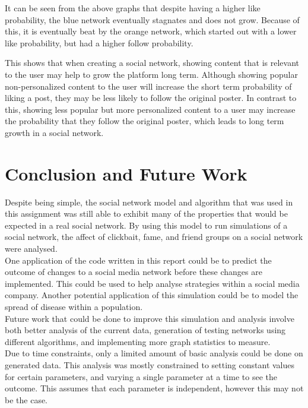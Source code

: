 \documentclass{article}
\begin{document}
It can be seen from the above graphs that despite having a higher like probability,
the blue network eventually stagnates and does not grow. Because of this,
it is eventually beat by the orange network, which started out with a lower like probability,
but had a higher follow probability.

This shows that when creating a social network, showing content that is relevant
to the user may help to grow the platform long term. Although showing 
popular non-personalized content to the user will increase the short term probability of liking a post,
they may be less likely to follow the original poster.
In contrast to this, showing less popular but more personalized content to a user
may increase the probability that they follow the original poster, which leads
to long term growth in a social network.

\section{Conclusion and Future Work}
Despite being simple, the social network model and algorithm that was used
in this assignment was still able to exhibit many of the properties
that would be expected in a real social network.
By using this model to run simulations of a social network, the affect of
clickbait, fame, and friend groups on a social network were analysed.\\

One application of the code written in this report could be to predict the outcome
of changes to a social media network before these changes are implemented.
This could be used to help analyse strategies within a social media company.
Another potential application of this simulation could be to model the spread of disease
within a population.\\

Future work that could be done to improve this simulation and analysis involve both better
analysis of the current data, generation of testing networks using different algorithms,
and implementing more graph statistics to measure.\\

Due to time constraints, only a limited amount of basic analysis could be done
on generated data. This analysis was mostly constrained to setting constant values for certain
parameters, and varying a single parameter at a time to see the outcome.
This assumes that each parameter is independent, however this may not be the case.
\end{document}
